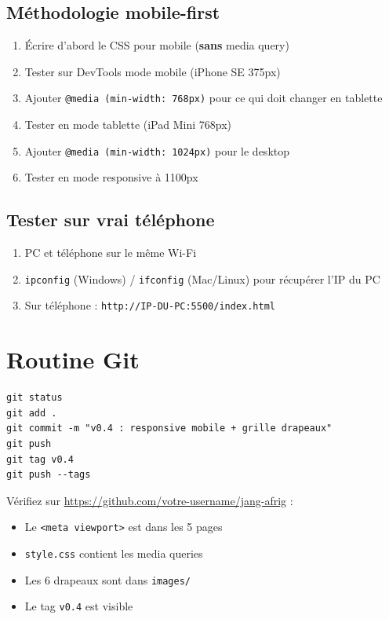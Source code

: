 \documentclass[11pt,a4paper]{article}
\begin{document}
\subsection{Méthodologie mobile-first}

\begin{enumerate}[leftmargin=*,nosep]
    \item Écrire d'abord le CSS pour mobile (\textbf{sans} media query)
    \item Tester sur DevTools mode mobile (iPhone SE 375px)
    \item Ajouter \texttt{@media (min-width: 768px)} pour ce qui doit changer en tablette
    \item Tester en mode tablette (iPad Mini 768px)
    \item Ajouter \texttt{@media (min-width: 1024px)} pour le desktop
    \item Tester en mode responsive à 1100px
\end{enumerate}

\subsection{Tester sur vrai téléphone}

\begin{enumerate}[nosep]
    \item PC et téléphone sur le même Wi-Fi
    \item \texttt{ipconfig} (Windows) / \texttt{ifconfig} (Mac/Linux) pour récupérer l'IP du PC
    \item Sur téléphone : \texttt{http://IP-DU-PC:5500/index.html}
\end{enumerate}

\newpage

\section{Routine Git}

\begin{lstlisting}
git status
git add .
git commit -m "v0.4 : responsive mobile + grille drapeaux"
git push
git tag v0.4
git push --tags
\end{lstlisting}

Vérifiez sur \url{https://github.com/votre-username/jang-afrig} :
\begin{itemize}[nosep]
    \item Le \texttt{<meta viewport>} est dans les 5 pages
    \item \texttt{style.css} contient les media queries
    \item Les 6 drapeaux sont dans \texttt{images/}
    \item Le tag \texttt{v0.4} est visible
\end{itemize}
\end{document}

